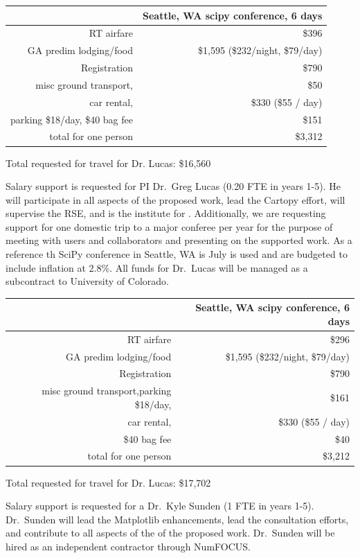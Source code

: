 \documentclass[12pt]{article}
\numberwithin{page}{section}
\begin{document}
\begin{tabular}{|r|r|}
  \hline
  & Seattle, WA scipy conference, 6 days\\\hline
  RT airfare & \$396 \\\hline
  GA predim lodging/food & \$1,595 (\$232/night, \$79/day) \\\hline
  Registration & \$790 \\\hline
  misc ground transport, & \$50 \\\hline
  car rental, & \$330 (\$55 / day) \\\hline
  parking \@ \$18/day, \$40 bag fee & \$151 \\\hline\hline
  total for one person & \$3,312    \\\hline
\end{tabular}

Total requested for travel for Dr. Lucas: \$16,560

Salary support is requested for PI Dr.\ Greg Lucas (0.20 FTE in years 1-5).  He
will participate in all aspects of the proposed work, lead the Cartopy effort,
will supervise the RSE, and is the institute for .  Additionally, we are
requesting support for one domestic trip to a major conferee per year for the
purpose of meeting with users and collaborators and presenting on the supported
work.  As a reference th SciPy conference in Seattle, WA is July is used and
are budgeted to include inflation at 2.8\%.  All funds for Dr.\ Lucas will be
managed as a subcontract to University of Colorado.


\begin{tabular}{|r|r|}
  \hline
  & Seattle, WA scipy conference, 6 days\\\hline
  RT airfare & \$296 \\\hline
  GA predim lodging/food & \$1,595 (\$232/night, \$79/day) \\\hline
  Registration & \$790 \\\hline
  misc ground transport,parking \@ \$18/day,  & \$161 \\\hline
  car rental, & \$330 (\$55 / day) \\\hline
  \$40 bag fee & \$40 \\\hline\hline
  total for one person & \$3,212    \\\hline
\end{tabular}

Total requested for travel for Dr. Lucas: \$17,702


Salary support is requested for a Dr.\ Kyle Sunden (1 FTE in years 1-5).
Dr.\ Sunden will lead the Matplotlib enhancements, lead the consultation
efforts, and contribute to all aspects of the of the proposed work.
Dr.\ Sunden will be hired as an independent contractor through NumFOCUS.
\end{document}
